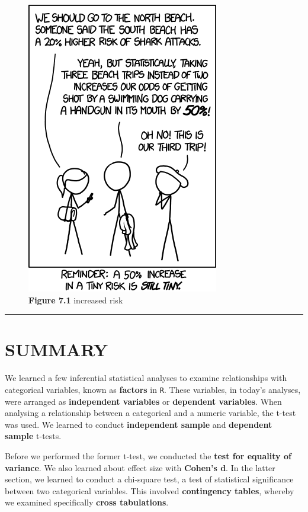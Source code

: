 \documentclass[
]{book}
\begin{document}
\begin{figure}
\centering
\includegraphics{Images/increased_risk.png}
\caption{\textbf{Figure 7.1} increased risk}
\end{figure}

\begin{center}\rule{0.5\linewidth}{0.5pt}\end{center}

\hypertarget{summary-6}{%
\section{SUMMARY}\label{summary-6}}

We learned a few inferential statistical analyses to examine relationships with categorical variables, known as \textbf{factors} in \texttt{R}. These variables, in today's analyses, were arranged as \textbf{independent variables} or \textbf{dependent variables}. When analysing a relationship between a categorical and a numeric variable, the t-test was used. We learned to conduct \textbf{independent sample} and \textbf{dependent sample} t-tests.

Before we performed the former t-test, we conducted the \textbf{test for equality of variance}. We also learned about effect size with \textbf{Cohen's d}. In the latter section, we learned to conduct a chi-square test, a test of statistical significance between two categorical variables. This involved \textbf{contingency tables}, whereby we examined specifically \textbf{cross tabulations}.
\end{document}
